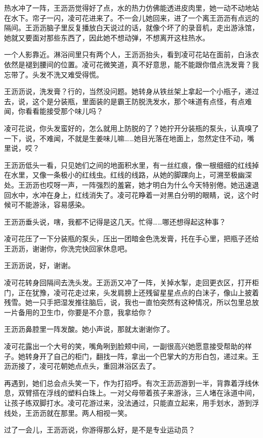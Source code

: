 \documentclass[lang=cn,newtx,12pt,scheme=chinese]{elegantbook}
\begin{document}
热水冲了一阵，王沥沥觉得好了点，水的热力仿佛能透进皮肉里，她一动不动地站在水下。帘子一闪，凌可花进来了。不一会儿她回来，进了一个离王沥沥有点远的隔间。王沥沥脑子里反复播放白天说过的话，就像个坏了的录音机，走出游泳馆，她就又要面对那些东西了，因此她不想动弹，不想离开这柱热水。

一个人影靠近。淋浴间里只有两个人，王沥沥抬头，看到凌可花站在面前，白泳衣依然是褪到腰间的位置。凌可花微笑道，真不好意思，能不能跟你借点洗发膏？我忘带了。头发不洗又难受得慌。

王沥沥说，洗发膏？行的，当然没问题。她转身从铁丝架上拿起一个小瓶子，递过去，说，这个是分装瓶，里面装的是霸王防脱洗发水，那个味道有点怪，有点难闻，你看看能接受那个味儿吗？

凌可花说，你头发蛮好的，怎么就用上防脱的了？她拧开分装瓶的泵头，认真嗅了一下，说，不难闻，不就是生姜味儿嘛……她目光落在地面上，忽然定住不动，嘴里说，哎？

王沥沥低头一看，只见她们之间的地面积水里，有一丝红痕，像一根细细的红线掉在水里，又像一条极小的红线虫。红线的线路，从她的脚踝向上，可溯至极幽深处。王沥沥也哎呀一声，一阵强烈的羞窘，她才明白为什么今天特别倦。她迅速退回水中，水冲在身上，红线消失了。凌可花睁着一对黑白分明的眼睛，说，这个时候可不能游泳，容易感染。

王沥沥垂头说，嗐，我都不记得是这几天。忙得……哪还想得起这种事？

凌可花压了一下分装瓶的泵头，压出一团暗金色洗发膏，托在手心里，把瓶子还给王沥沥，谢谢你，你洗完快回家休息吧。

王沥沥说，好，谢谢。

凌可花转身回隔间去洗头发。王沥沥又冲了一阵，关掉水掣，走回更衣区，打开柜门，正在犹豫，凌可花走过来，头发肩膀上还残留星星点点的白沫子，像山上披着残雪。她一只手把湿发推往脑后，说，我也一直怕突然有这种情况，所以包里总放一片备用的卫生巾，你要是不介意，我拿给你？

王沥沥鼻腔里一阵发酸。她小声说，那就太谢谢你了。

凌可花露出一个大号的笑，嘴角咧到脸颊中间，一副很高兴她愿意接受帮助的样子。她转身开了自己的柜门，翻找一阵，拿出一个巴掌大的方形白包，递过来。王沥沥接了，凌可花朝她点点头，重回淋浴区去了。

再遇到，她们总会点头笑一下，作为打招呼。有次王沥沥游到一半，背靠着浮线休息，双臂搭在浮线的塑料白珠上。一对父母带着孩子来游泳，三人堵在泳道中间，让孩子练双脚打水。凌可花游过来，没法通过，只能直立起来，用手划水，游到浮线处，王沥沥就在那里。两人相视一笑。

过了一会儿，王沥沥说，你游得那么好，是不是专业运动员？
\end{document}
